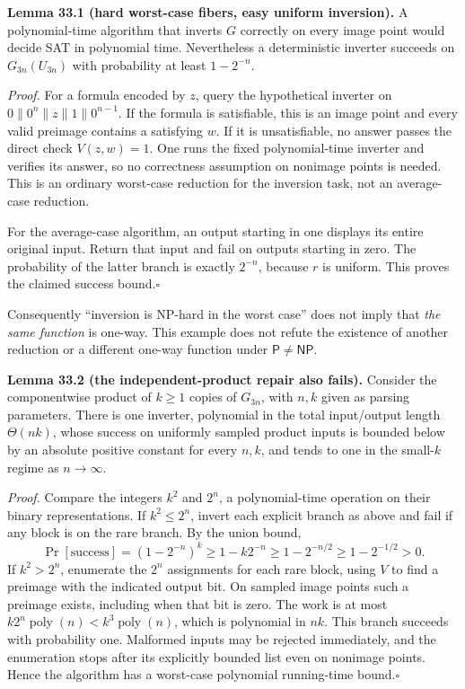 \documentclass[11pt,a4paper]{article}
\numberwithin{equation}{section}
\begin{document}
\textbf{Lemma 33.1 (hard worst-case fibers, easy uniform inversion).}
A polynomial-time algorithm that inverts $G$ correctly on every image point
would decide SAT in polynomial time. Nevertheless a deterministic inverter
succeeds on $G_{3n}(U_{3n})$ with probability at least $1-2^{-n}$.

\emph{Proof.} For a formula encoded by $z$, query the hypothetical inverter
on $0\|0^n\|z\|1\|0^{n-1}$. If the formula is satisfiable, this is an image
point and every valid preimage contains a satisfying $w$. If it is
unsatisfiable, no answer passes the direct check $V(z,w)=1$. One runs the
fixed polynomial-time inverter and verifies its answer, so no correctness
assumption on nonimage points is needed. This is an ordinary worst-case
reduction for the inversion task, not an average-case reduction.

For the average-case algorithm, an output starting in one displays its
entire original input. Return that input and fail on outputs starting in
zero. The probability of the latter branch is exactly $2^{-n}$, because
$r$ is uniform. This proves the claimed success bound.\hfill$\square$

Consequently ``inversion is NP-hard in the worst case'' does not imply that
\emph{the same function} is one-way. This example does not refute the
existence of another reduction or a different one-way function under
$\mathsf P\ne\mathsf{NP}$.

\medskip
\textbf{Lemma 33.2 (the independent-product repair also fails).}
Consider the componentwise product of $k\ge1$ copies of $G_{3n}$, with
$n,k$ given as parsing parameters. There is one inverter, polynomial in the
total input/output length $\Theta(nk)$, whose success on uniformly sampled
product inputs is bounded below by an absolute positive constant for every
$n,k$, and tends to one in the small-$k$ regime as $n\to\infty$.

\emph{Proof.} Compare the integers $k^2$ and $2^n$, a polynomial-time
operation on their binary representations.
If $k^2\le2^n$, invert each explicit branch as above and fail if any block
is on the rare branch. By the union bound,
\begin{equation}\label{r33:smallproduct}
 \Pr[\text{success}]=(1-2^{-n})^k
           \ge1-k2^{-n}\ge1-2^{-n/2}\ge1-2^{-1/2}>0.
\end{equation}
If $k^2>2^n$, enumerate the $2^n$ assignments for each rare block, using
$V$ to find a preimage with the indicated output bit. On sampled image
points such a preimage exists, including when that bit is zero. The work
is at most $k2^n\operatorname{poly}(n)<k^3\operatorname{poly}(n)$,
which is polynomial in $nk$. This branch succeeds with probability one.
Malformed inputs may be rejected immediately, and the enumeration stops
after its explicitly bounded list even on nonimage points. Hence the
algorithm has a worst-case polynomial running-time bound.\hfill$\square$
\end{document}
